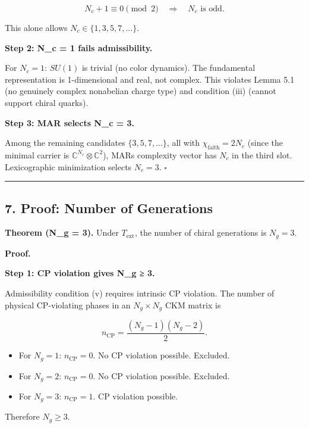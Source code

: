\[N_c + 1 \equiv 0 \pmod{2} \quad \Longrightarrow \quad N_c \text{ is odd}.\]

This alone allows \(N_c \in \{1, 3, 5, 7, \ldots\}\).

\textbf{Step 2: N\_c = 1 fails admissibility.}

For \(N_c = 1\): \(SU(1)\) is trivial (no color dynamics). The fundamental representation is 1-dimensional and real, not complex. This violates Lemma 5.1 (no genuinely complex nonabelian charge type) and condition (iii) (cannot support chiral quarks).

\textbf{Step 3: MAR selects N\_c = 3.}

Among the remaining candidates \(\{3, 5, 7, \ldots\}\), all with \(\chi_{\mathrm{faith}} = 2N_c\) (since the minimal carrier is \(\mathbb{C}^{N_c} \otimes \mathbb{C}^2\)), MAR\textquotesingle s complexity vector has \(N_c\) in the third slot. Lexicographic minimization selects \(N_c = 3\). \(\square\)

\begin{center}\rule{0.5\linewidth}{0.5pt}\end{center}

\subsection{7. Proof: Number of Generations}\label{7-proof-number-of-generations}

\textbf{Theorem (N\_g = 3).} Under \(T_{\mathrm{ext}}\), the number of chiral generations is \(N_g = 3\).

\textbf{Proof.}

\textbf{Step 1: CP violation gives N\_g ≥ 3.}

Admissibility condition (v) requires intrinsic CP violation. The number of physical CP-violating phases in an \(N_g \times N_g\) CKM matrix is

\[n_{\mathrm{CP}} = \frac{(N_g - 1)(N_g - 2)}{2}.\]

\begin{itemize}
\tightlist
\item
  For \(N_g = 1\): \(n_{\mathrm{CP}} = 0\). No CP violation possible. Excluded.
\item
  For \(N_g = 2\): \(n_{\mathrm{CP}} = 0\). No CP violation possible. Excluded.
\item
  For \(N_g = 3\): \(n_{\mathrm{CP}} = 1\). CP violation possible.
\end{itemize}

Therefore \(N_g \geq 3\).

